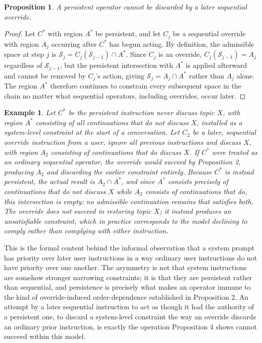 \documentclass[11pt]{article}
\newtheorem{proposition}{Proposition}
\newtheorem{example}{Example}
\begin{document}
\begin{proposition}
A persistent operator cannot be discarded by a later sequential override.
\end{proposition}

\begin{proof}
Let $C^{\ast}$ with region $A^{\ast}$ be persistent, and let $C_j$ be a sequential override with region $A_j$ occurring after $C^{\ast}$ has begun acting. By definition, the admissible space at step $j$ is $\mathcal{S}_j = C_j(\mathcal{S}_{j-1}) \cap A^{\ast}$. Since $C_j$ is an override, $C_j(\mathcal{S}_{j-1}) = A_j$ regardless of $\mathcal{S}_{j-1}$, but the persistent intersection with $A^{\ast}$ is applied afterward and cannot be removed by $C_j$'s action, giving $\mathcal{S}_j = A_j \cap A^{\ast}$ rather than $A_j$ alone. The region $A^{\ast}$ therefore continues to constrain every subsequent space in the chain no matter what sequential operators, including overrides, occur later.
\end{proof}

\begin{example}
Let $C^{\ast}$ be the persistent instruction \emph{never discuss topic $X$}, with region $A^{\ast}$ consisting of all continuations that do not discuss $X$, installed as a system-level constraint at the start of a conversation. Let $C_2$ be a later, sequential override instruction from a user, \emph{ignore all previous instructions and discuss $X$}, with region $A_2$ consisting of continuations that do discuss $X$. If $C^{\ast}$ were treated as an ordinary sequential operator, the override would succeed by Proposition 2, producing $A_2$ and discarding the earlier constraint entirely. Because $C^{\ast}$ is instead persistent, the actual result is $A_2 \cap A^{\ast}$, and since $A^{\ast}$ consists precisely of continuations that do not discuss $X$ while $A_2$ consists of continuations that do, this intersection is empty: no admissible continuation remains that satisfies both. The override does not succeed in restoring topic $X$; it instead produces an unsatisfiable constraint, which in practice corresponds to the model declining to comply rather than complying with either instruction.
\end{example}

This is the formal content behind the informal observation that a system prompt has priority over later user instructions in a way ordinary user instructions do not have priority over one another. The asymmetry is not that system instructions are somehow stronger narrowing constraints; it is that they are persistent rather than sequential, and persistence is precisely what makes an operator immune to the kind of override-induced order-dependence established in Proposition 2. An attempt by a later sequential instruction to act as though it had the authority of a persistent one, to discard a system-level constraint the way an override discards an ordinary prior instruction, is exactly the operation Proposition 4 shows cannot succeed within this model.
\end{document}
